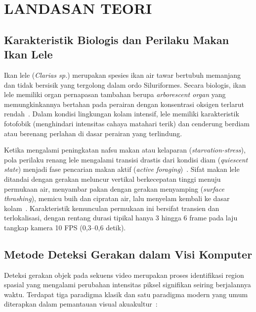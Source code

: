 \section{LANDASAN TEORI}
\label{sec:landasan-teori}

\subsection{Karakteristik Biologis dan Perilaku Makan Ikan Lele}
Ikan lele (\textit{Clarias sp.}) merupakan spesies ikan air tawar bertubuh memanjang dan tidak bersisik yang tergolong dalam ordo Siluriformes. Secara biologis, ikan lele memiliki organ pernapasan tambahan berupa \textit{arborescent organ} yang memungkinkannya bertahan pada perairan dengan konsentrasi oksigen terlarut rendah~\cite{Marliza2021}. Dalam kondisi lingkungan kolam intensif, lele memiliki karakteristik fotofobik (menghindari intensitas cahaya matahari terik) dan cenderung berdiam atau berenang perlahan di dasar perairan yang terlindung.

Ketika mengalami peningkatan nafsu makan atau kelaparan (\textit{starvation-stress}), pola perilaku renang lele mengalami transisi drastis dari kondisi diam (\textit{quiescent state}) menjadi fase pencarian makan aktif (\textit{active foraging})~\cite{Alahmad2025}. Sifat makan lele ditandai dengan gerakan meluncur vertikal berkecepatan tinggi menuju permukaan air, menyambar pakan dengan gerakan menyamping (\textit{surface thrashing}), memicu buih dan cipratan air, lalu menyelam kembali ke dasar kolam~\cite{Li2020}. Karakteristik kemunculan permukaan ini bersifat transien dan terlokalisasi, dengan rentang durasi tipikal hanya 3 hingga 6 frame pada laju tangkap kamera 10 FPS (0,3--0,6 detik).

\subsection{Metode Deteksi Gerakan dalam Visi Komputer}
Deteksi gerakan objek pada sekuens video merupakan proses identifikasi region spasial yang mengalami perubahan intensitas piksel signifikan seiring berjalannya waktu. Terdapat tiga paradigma klasik dan satu paradigma modern yang umum diterapkan dalam pemantauan visual akuakultur~\cite{Al-Abri2025,Yang2025}:

